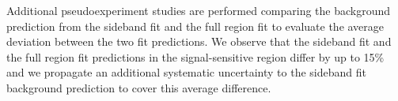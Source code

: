 Additional pseudoexperiment studies are performed comparing the background prediction
from the sideband fit and the full region fit to evaluate the average
deviation between the two fit predictions. We observe that 
the sideband fit and the full region fit predictions in the
signal-sensitive region differ by up to 15\% and we propagate an
additional systematic uncertainty to the sideband fit background
prediction to cover this average difference.


